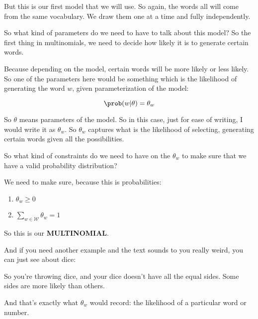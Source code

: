 \documentclass[a4paper, 12pt]{article}
\begin{document}
But this is our first model that we will use. So again, the words all will come
from the same vocabulary. We draw them one at a time and fully independently.

So what kind of parameters do we need to have to talk about this model? So the
first thing in multinomials, we need to decide how likely it is to generate
certain words.

Because depending on the model, certain words will be more likely or less
likely. So one of the parameters here would be something which is the likelihood
of generating the word \(w\), given parameterization of the model:

\begin{equation}
\prob(w|\theta) = \theta_w
\end{equation}

So \(\theta\) means parameters of the model. So in this case, just for ease of
writing, I would write it as \(\theta_w\). So \(\theta_w\) captures what is the
likelihood of selecting, generating certain words given all the possibilities.

So what kind of constraints do we need to have on the \(\theta_w\) to make sure
that we have a valid probability distribution?

We need to make sure, because this is probabilities:

\begin{enumerate}
\item \(\theta_w \geq 0\)
\item \(\sum_{w \in \mathcal{W}} \theta_w = 1\)
\end{enumerate}

So this is our \textbf{MULTINOMIAL}.

And if you need another example and the text sounds to you really weird, you can
just see about dice:

So you're throwing dice, and your dice doesn't have all the equal sides. Some
sides are more likely than others.

And that's exactly what  \(\theta_w\) would record: the likelihood of a
particular word or number.
\end{document}
